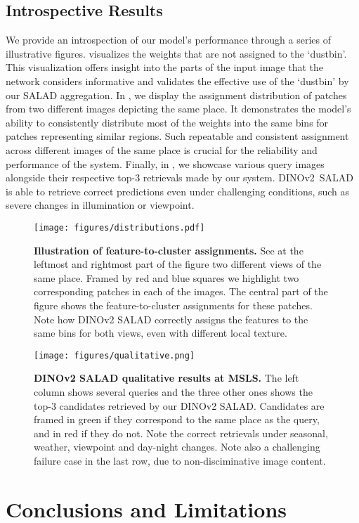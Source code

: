 \documentclass[10pt,twocolumn,letterpaper]{article}
\begin{document}
\subsection{Introspective Results}
\label{subsec:qualitative}

We provide an introspection of our model's performance through a series of illustrative figures.  visualizes the weights that are not assigned to the `dustbin'. This visualization offers insight into the parts of the input image that the network considers informative and validates the effective use of the `dustbin' by our SALAD aggregation.
In , we display the assignment distribution of patches from two different images depicting the same place. It demonstrates the model's ability to consistently distribute most of the weights into the same bins for patches representing similar regions. Such repeatable and consistent assignment across different images of the same place is crucial for the reliability and performance of the system.
Finally, in , we showcase various query images alongside their respective top-3 retrievals made by our system. \mbox{DINOv2 SALAD} is able to retrieve correct predictions even under challenging conditions, such as severe changes in illumination or viewpoint. 


\begin{figure*}[!htb]
  \centering
   \texttt{[image: figures/distributions.pdf]}
   \caption{\textbf{Illustration of feature-to-cluster assignments.} See at the leftmost and rightmost part of the figure two different views of the same place. Framed by red and blue squares we highlight two corresponding patches in each of the images. The central part of the figure shows the feature-to-cluster assignments for these patches. Note how DINOv2 SALAD correctly assigns the features to the same bins for both views, even with different local texture. }
   \label{fig:distributions}\vspace{0.5em}
  \centering
   \texttt{[image: figures/qualitative.png]}
   \caption{\textbf{DINOv2 SALAD qualitative results at MSLS.} The left column shows several queries and the three other ones shows the top-3 candidates retrieved by our DINOv2 SALAD. Candidates are framed in green if they correspond to the same place as the query, and in red if they do not. Note the correct retrievals under seasonal, weather, viewpoint and day-night changes. Note also a challenging failure case in the last row, due to non-disciminative image content.}
   \label{fig:qualitative}
\end{figure*} \section{Conclusions and Limitations}
\end{document}
